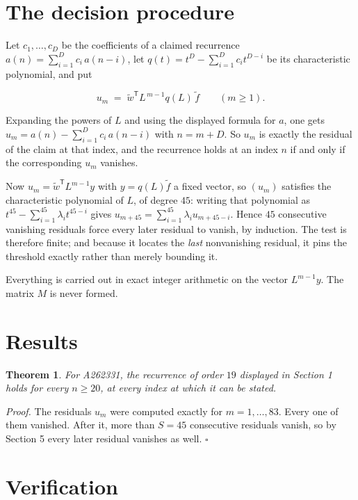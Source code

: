 \documentclass[11pt]{article}
\newtheorem{theorem}{Theorem}
\theoremstyle{definition}
\begin{document}
\section{The decision procedure}

Let $c_1,\dots,c_D$ be the coefficients of a claimed recurrence $a(n) = \sum_{i=1}^{D} c_i\,a(n-i)$, let $q(t) = t^{D} - \sum_{i=1}^{D} c_i t^{D-i}$ be its characteristic polynomial, and put

\[u_m \;=\; \tilde w^{\mathsf T} L^{\,m-1} q(L)\,\tilde f \qquad (m \ge 1).\]

Expanding the powers of $L$ and using the displayed formula for $a$, one gets $u_m = a(n) - \sum_{i=1}^{D} c_i\,a(n-i)$ with $n = m + D$. So $u_m$ is exactly the residual of the claim at that index, and the recurrence holds at an index $n$ if and only if the corresponding $u_m$ vanishes.

Now $u_m = \tilde w^{\mathsf T} L^{m-1} y$ with $y = q(L)\tilde f$ a fixed vector, so $(u_m)$ satisfies the characteristic polynomial of $L$, of degree $45$: writing that polynomial as $t^{45} - \sum_{i=1}^{45} \lambda_i t^{45-i}$ gives $u_{m+45} = \sum_{i=1}^{45} \lambda_i u_{m+45-i}$. Hence $45$ consecutive vanishing residuals force every later residual to vanish, by induction. The test is therefore finite; and because it locates the {\itshape last} nonvanishing residual, it pins the threshold exactly rather than merely bounding it.

Everything is carried out in exact integer arithmetic on the vector $L^{m-1}y$. The matrix $M$ is never formed.

\section{Results}

\begin{theorem} For A262331, the recurrence of order $19$ displayed in Section 1 holds for every $n \ge 20$, at every index at which it can be stated.\end{theorem}

{\itshape Proof.} The residuals $u_m$ were computed exactly for $m = 1,\dots,83$. Every one of them vanished. After it, more than $S = 45$ consecutive residuals vanish, so by Section 5 every later residual vanishes as well. $\square$

\section{Verification}
\end{document}
